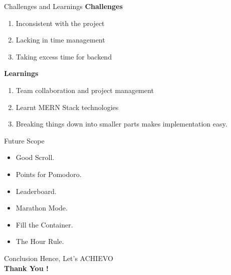 \documentclass{beamer}
\begin{document}
\begin{frame}{Challenges and Learnings}
    \textbf{Challenges}
    \begin{enumerate}
        \item Inconsistent with the project
        \item Lacking in time management
        \item Taking excess time for backend
    \end{enumerate}
    \textbf{Learnings}
    \begin{enumerate}
        \item Team collaboration and project management
        \item Learnt MERN Stack technologies
        \item Breaking things down into smaller parts makes implementation easy.
    \end{enumerate}
\end{frame}

\begin{frame}{Future Scope}
  \begin{itemize}
    \item Good Scroll.
    \item Points for Pomodoro.
    \item Leaderboard.
    \item Marathon Mode.
    \item Fill the Container.
    \item The Hour Rule.
  \end{itemize}
\end{frame}

\begin{frame}{Conclusion}
    \justifying
    \centering
    Hence, Let's ACHIEVO \\
    \bigskip
    \bigskip
    \centering
    \Huge\textbf{Thank You !}
\end{frame}
\end{document}
